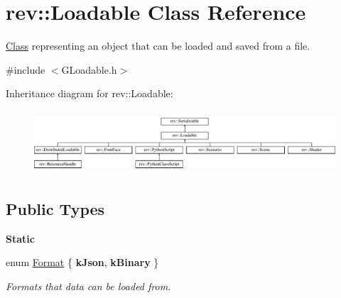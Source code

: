 \hypertarget{classrev_1_1_loadable}{}\section{rev\+::Loadable Class Reference}
\label{classrev_1_1_loadable}


\mbox{\hyperlink{struct_class}{Class}} representing an object that can be loaded and saved from a file.  




{\ttfamily \#include $<$G\+Loadable.\+h$>$}

Inheritance diagram for rev\+::Loadable\+:\begin{figure}[H]
\begin{center}
\leavevmode
\includegraphics[height=2.377919cm]{classrev_1_1_loadable}
\end{center}
\end{figure}
\subsection*{Public Types}
\begin{Indent}\textbf{ Static}\par
\begin{DoxyCompactItemize}
\item 
\mbox{\label{classrev_1_1_loadable_a0c39880424f12f4c758f59ee829a0247}} 
enum \mbox{\hyperlink{classrev_1_1_loadable_a0c39880424f12f4c758f59ee829a0247}{Format}} \{ {\bfseries k\+Json}, 
{\bfseries k\+Binary}
 \}
\begin{DoxyCompactList}\small\item\em Formats that data can be loaded from. \end{DoxyCompactList}\end{DoxyCompactItemize}
\end{Indent}
